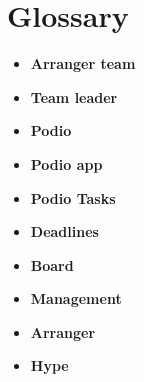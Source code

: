 \section{Glossary}
\begin{itemize}
	\item \textbf{Arranger team}\\
	\item \textbf{Team leader}\\
	\item \textbf{Podio}\\
	\item \textbf{Podio app}\\
	\item \textbf{Podio Tasks}\\
	\item \textbf{Deadlines}\\
	\item \textbf{Board}\\
	\item \textbf{Management}\\
	\item \textbf{Arranger}\\
	\item \textbf{Hype}\\
\end{itemize}